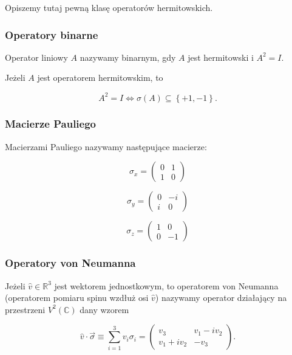 Opiszemy tutaj pewną klasę operatorów hermitowskich.

\subsubsection{Operatory binarne}

\begin{definition}
    Operator liniowy $A$ nazywamy binarnym, gdy $A$ jest hermitowski i $A ^ 2 = I$.
\end{definition}

\begin{fact}
    Jeżeli $A$ jest operatorem hermitowskim, to

    $$
        A ^ {2} = I \Longleftrightarrow \sigma(A) \subseteq \left\{+1,-1\right\}.
    $$
\end{fact}

\subsubsection{Macierze Pauliego}

\begin{definition}
    Macierzami Pauliego nazywamy następujące macierze:

    $$
        \sigma_{x} =
        \begin{pmatrix}
            0 & 1 \\
            1 & 0
        \end{pmatrix}
    $$

    $$
        \sigma_{y} =
        \begin{pmatrix}
            0 & -i \\
            i & 0
        \end{pmatrix}
    $$

    $$
        \sigma_{z} =
        \begin{pmatrix}
            1 & 0 \\
            0 & -1
        \end{pmatrix}
    $$
\end{definition}

\subsubsection{Operatory von Neumanna}

\begin{definition}
    Jeżeli $\hat{v} \in \mathbb{R} ^ 3$ jest wektorem jednostkowym, to operatorem von Neumanna (operatorem pomiaru spinu wzdłuż osi $\hat{v}$) nazywamy operator działający na przestrzeni $V ^ {2} (\mathbb{C})$ dany wzorem

    $$
        \hat{v} \cdot \vec{\sigma} \equiv \sum\limits_{i = 1} ^ {3} v_{i} \sigma_{i} =
        \begin{pmatrix}
            v_3 & v_{1} - i v_{2} \\
            v_{1} + i v_{2} & -v_3
        \end{pmatrix}.
    $$
\end{definition}

